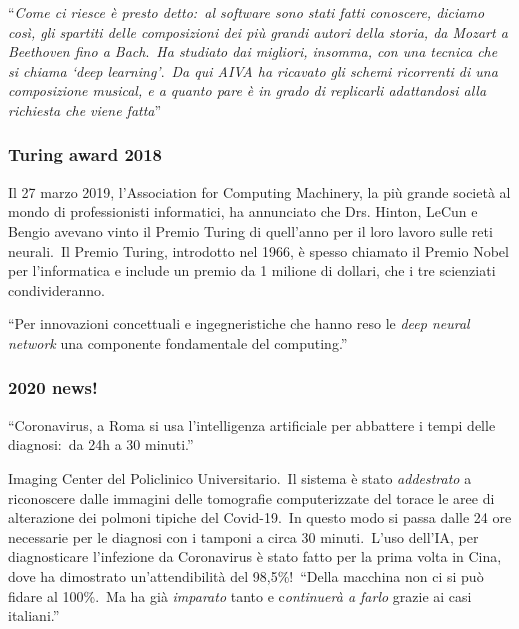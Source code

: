 \vspace{12pt}

\noindent``\textit{Come ci riesce è presto detto:\ al software sono stati fatti conoscere, diciamo così, gli spartiti delle composizioni dei più grandi autori della storia, da Mozart a Beethoven fino a Bach}.\
\textit{Ha studiato dai migliori, insomma, con una tecnica che si chiama `deep learning'}.\
\textit{Da qui AIVA ha ricavato gli schemi ricorrenti di una composizione musical, e a quanto pare è in grado di replicarli adattandosi alla richiesta che viene fatta}''

\subsubsection{Turing award 2018}

Il 27 marzo 2019, l'Association for Computing Machinery, la più grande società al mondo di professionisti informatici, ha annunciato che Drs. Hinton, LeCun e Bengio avevano vinto il Premio Turing di quell'anno per il loro lavoro sulle reti neurali.\
Il Premio Turing, introdotto nel 1966, è spesso chiamato il Premio Nobel per l'informatica e include un premio da 1 milione di dollari, che i tre scienziati condivideranno.

``Per innovazioni concettuali e ingegneristiche che hanno reso le \textit{deep neural network} una componente fondamentale del computing.''

\subsubsection{2020 news!}

\begin{center}
	``Coronavirus, a Roma si usa l'intelligenza artificiale per abbattere i tempi delle diagnosi:\ da 24h a 30 minuti.''
\end{center}
Imaging Center del Policlinico Universitario.\
Il sistema è stato \textit{addestrato} a riconoscere dalle immagini delle tomografie computerizzate del torace le aree di alterazione dei polmoni tipiche del Covid-19.\
In questo modo si passa dalle 24 ore necessarie per le diagnosi con i tamponi a circa 30 minuti.\
L'uso dell’IA, per diagnosticare l'infezione da Coronavirus è stato fatto per la prima volta in Cina, dove ha dimostrato un'attendibilità del 98,5\%!\
``Della macchina non ci si può fidare al 100\%.\ Ma ha già \textit{imparato} tanto e c\textit{ontinuerà a farlo} grazie ai casi italiani.''

